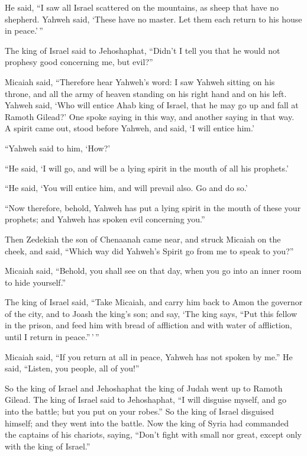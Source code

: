  He said, ``I saw all Israel scattered on the mountains, as
sheep that have no shepherd. Yahweh said, `These have no master. Let
them each return to his house in peace.'\,''

 The king of Israel said to Jehoshaphat, ``Didn't I tell
you that he would not prophesy good concerning me, but evil?''

 Micaiah said, ``Therefore hear Yahweh's word: I saw Yahweh
sitting on his throne, and all the army of heaven standing on his right
hand and on his left.  Yahweh said, `Who will entice Ahab
king of Israel, that he may go up and fall at Ramoth Gilead?' One spoke
saying in this way, and another saying in that way.  A
spirit came out, stood before Yahweh, and said, `I will entice him.'

``Yahweh said to him, `How?'

 ``He said, `I will go, and will be a lying spirit in the
mouth of all his prophets.'

``He said, `You will entice him, and will prevail also. Go and do so.'

 ``Now therefore, behold, Yahweh has put a lying spirit in
the mouth of these your prophets; and Yahweh has spoken evil concerning
you.''

 Then Zedekiah the son of Chenaanah came near, and struck
Micaiah on the cheek, and said, ``Which way did Yahweh's Spirit go from
me to speak to you?''

 Micaiah said, ``Behold, you shall see on that day, when
you go into an inner room to hide yourself.''

 The king of Israel said, ``Take Micaiah, and carry him
back to Amon the governor of the city, and to Joash the king's son;
 and say, `The king says, ``Put this fellow in the prison,
and feed him with bread of affliction and with water of affliction,
until I return in peace.''\,'\,''

 Micaiah said, ``If you return at all in peace, Yahweh has
not spoken by me.'' He said, ``Listen, you people, all of you!''

 So the king of Israel and Jehoshaphat the king of Judah
went up to Ramoth Gilead.  The king of Israel said to
Jehoshaphat, ``I will disguise myself, and go into the battle; but you
put on your robes.'' So the king of Israel disguised himself; and they
went into the battle.  Now the king of Syria had commanded
the captains of his chariots, saying, ``Don't fight with small nor
great, except only with the king of Israel.''

